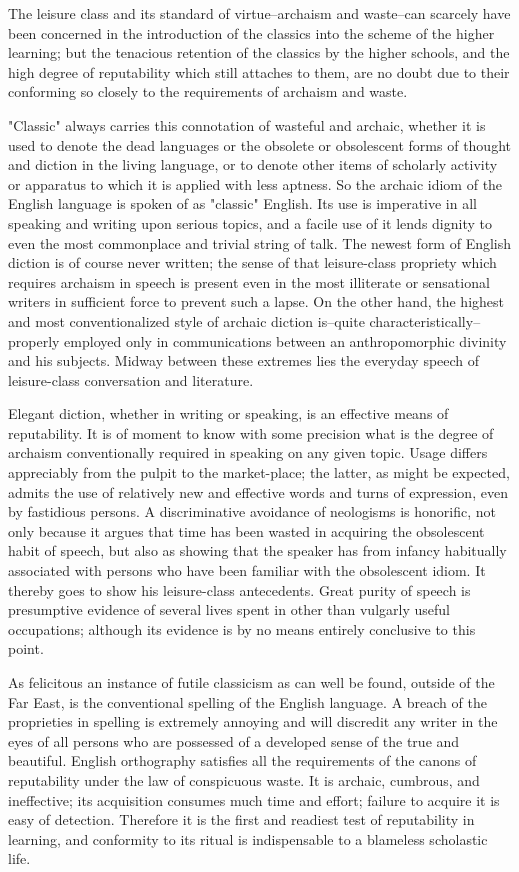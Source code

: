 \documentclass[12pt]{report}
\begin{document}
The leisure class and its standard of virtue--archaism and waste--can
scarcely have been concerned in the introduction of the classics into
the scheme of the higher learning; but the tenacious retention of the
classics by the higher schools, and the high degree of reputability
which still attaches to them, are no doubt due to their conforming so
closely to the requirements of archaism and waste.

"Classic" always carries this connotation of wasteful and archaic,
whether it is used to denote the dead languages or the obsolete or
obsolescent forms of thought and diction in the living language, or to
denote other items of scholarly activity or apparatus to which it is
applied with less aptness. So the archaic idiom of the English language
is spoken of as "classic" English. Its use is imperative in all speaking
and writing upon serious topics, and a facile use of it lends dignity to
even the most commonplace and trivial string of talk. The newest form
of English diction is of course never written; the sense of that
leisure-class propriety which requires archaism in speech is present
even in the most illiterate or sensational writers in sufficient
force to prevent such a lapse. On the other hand, the highest and
most conventionalized style of archaic diction is--quite
characteristically--properly employed only in communications between an
anthropomorphic divinity and his subjects. Midway between these extremes
lies the everyday speech of leisure-class conversation and literature.

Elegant diction, whether in writing or speaking, is an effective means
of reputability. It is of moment to know with some precision what is
the degree of archaism conventionally required in speaking on any given
topic. Usage differs appreciably from the pulpit to the market-place;
the latter, as might be expected, admits the use of relatively new and
effective words and turns of expression, even by fastidious persons. A
discriminative avoidance of neologisms is honorific, not only because it
argues that time has been wasted in acquiring the obsolescent habit of
speech, but also as showing that the speaker has from infancy habitually
associated with persons who have been familiar with the obsolescent
idiom. It thereby goes to show his leisure-class antecedents. Great
purity of speech is presumptive evidence of several lives spent in other
than vulgarly useful occupations; although its evidence is by no means
entirely conclusive to this point.

As felicitous an instance of futile classicism as can well be found,
outside of the Far East, is the conventional spelling of the English
language. A breach of the proprieties in spelling is extremely annoying
and will discredit any writer in the eyes of all persons who are
possessed of a developed sense of the true and beautiful. English
orthography satisfies all the requirements of the canons of reputability
under the law of conspicuous waste. It is archaic, cumbrous, and
ineffective; its acquisition consumes much time and effort; failure to
acquire it is easy of detection. Therefore it is the first and readiest
test of reputability in learning, and conformity to its ritual is
indispensable to a blameless scholastic life.
\end{document}
